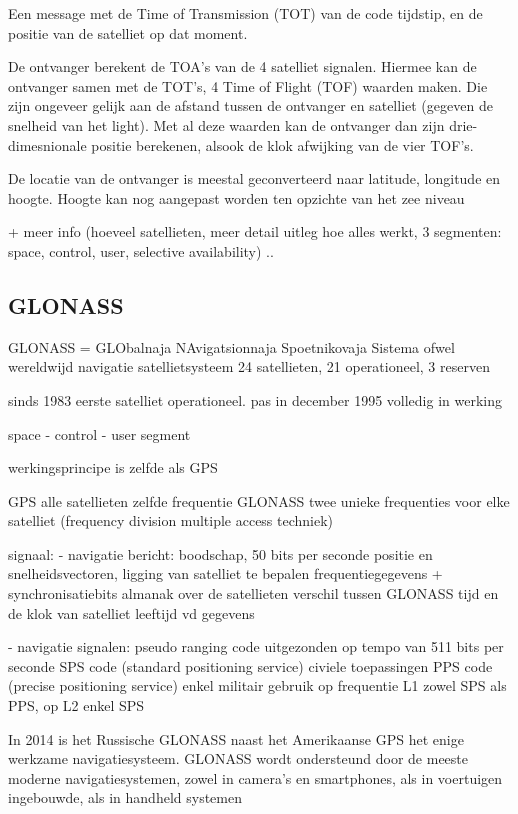 Een message met de Time of Transmission (TOT) van de code tijdstip, en de positie van de satelliet op dat moment.

De ontvanger berekent de TOA's  van de 4 satelliet signalen. Hiermee kan de ontvanger samen met de TOT's, 4 Time of Flight (TOF) waarden maken. Die zijn ongeveer gelijk aan de afstand tussen de ontvanger en satelliet (gegeven de snelheid van het light). Met al deze waarden kan de ontvanger dan zijn drie-dimesnionale positie berekenen, alsook de klok afwijking van de vier TOF's.

De locatie van de ontvanger is meestal geconverteerd naar latitude, longitude en hoogte. Hoogte kan nog aangepast worden ten opzichte van het zee niveau

+ meer info (hoeveel satellieten, meer detail uitleg hoe alles werkt, 3 segmenten: space, control, user, selective availability) ..


\subsection{GLONASS}
GLONASS = GLObalnaja NAvigatsionnaja Spoetnikovaja Sistema ofwel wereldwijd navigatie satellietsysteem
24 satellieten, 21 operationeel, 3 reserven

sinds 1983 eerste satelliet operationeel. pas in december 1995 volledig in werking

space - control - user segment

werkingsprincipe is zelfde als GPS

GPS alle satellieten zelfde frequentie
GLONASS twee unieke frequenties voor elke satelliet (frequency division multiple access techniek)

signaal:
- navigatie bericht: boodschap, 50 bits per seconde
	positie en snelheidsvectoren, ligging van satelliet te bepalen
	frequentiegegevens + synchronisatiebits
	almanak over de satellieten
	verschil tussen GLONASS tijd en de klok van satelliet
	leeftijd vd gegevens
	
- navigatie signalen: pseudo ranging code uitgezonden op tempo van 511 bits per seconde
	SPS code (standard positioning service) civiele toepassingen
	PPS code (precise positioning service) enkel militair gebruik
	op frequentie L1 zowel SPS als PPS, op L2 enkel SPS
	
In 2014 is het Russische GLONASS naast het Amerikaanse GPS het enige werkzame navigatiesysteem. GLONASS wordt ondersteund door de meeste moderne navigatiesystemen, zowel in camera's en smartphones, als in voertuigen ingebouwde, als in handheld systemen

